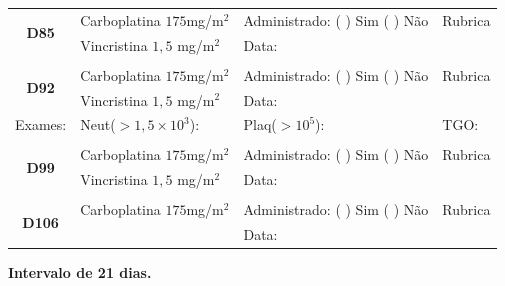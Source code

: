 \documentclass[11pt,a4paper,oldfontcommands]{memoir}
\begin{document}
\begin{center}
\begin{longtable}{p{1cm}p{4cm}|p{5cm}|p{3cm}}
    \hline
    \multicolumn{1}{c|}{\multirow{2}{*}{\textbf{D85}}}&{Carboplatina \(175\)mg/m\(^2\)}&{Administrado: (  ) Sim (  ) Não}&{Rubrica}\\
    \multicolumn{1}{c|}{}&{Vincristina \(1,5\) mg/m\(^2\)}&{Data:}&\\
    \hline
    \\
    \hline
    \multicolumn{1}{c|}{\multirow{2}{*}{\textbf{D92}}}&{Carboplatina \(175\)mg/m\(^2\)}&{Administrado: (  ) Sim (  ) Não}&{Rubrica}\\
    \multicolumn{1}{c|}{}&{Vincristina \(1,5\) mg/m\(^2\)}&{Data:}&\\
    \hline
    \multicolumn{1}{c|}{Exames:}&{Neut(\(>1,5\times10^3\)):}&{Plaq(\(>10^5\)):}&{TGO:}
    \\
    \hline
    \\
    \hline
    \multicolumn{1}{c|}{\multirow{2}{*}{\textbf{D99}}}&{Carboplatina \(175\)mg/m\(^2\)}&{Administrado: (  ) Sim (  ) Não}&{Rubrica}\\
    \multicolumn{1}{c|}{}&{Vincristina \(1,5\) mg/m\(^2\)}&{Data:}&\\
    \hline
    \\
    \hline
    \multicolumn{1}{c|}{\multirow{2}{*}{\textbf{D106}}}&{Carboplatina \(175\)mg/m\(^2\)}&{Administrado: (  ) Sim (  ) Não}&{Rubrica}\\
	\multicolumn{1}{c|}{}&&{Data:}&\\
    \hline
\end{longtable}
\textbf{Intervalo de 21 dias.}
\end{center}
\end{document}
